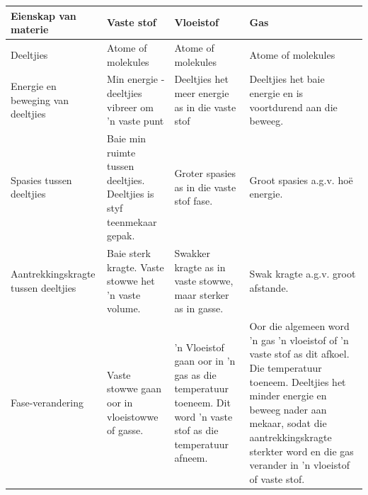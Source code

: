 \begin{table}[h]
\begin{center}

\begin{tabular}{|p{3cm}|p{3cm}|p{3cm}|p{3cm}|}\hline
\textbf{Eienskap van materie} & \textbf{Vaste stof} & \textbf{Vloeistof} & \textbf{Gas} \\\hline
Deeltjies & Atome of molekules & Atome of molekules & Atome of molekules \\\hline
Energie en beweging van deeltjies & Min energie - deeltjies vibreer om 'n vaste punt & Deeltjies het meer energie as in die vaste stof & Deeltjies het baie energie en is voortdurend aan die beweeg.  \\\hline
Spasies tussen  deeltjies & Baie min ruimte tussen deeltjies. Deeltjies is styf teenmekaar gepak. & Groter spasies as in die vaste stof fase. & Groot spasies a.g.v. ho\"{e} energie.  \\\hline
Aantrekkingskragte tussen deeltjies & Baie sterk kragte. Vaste stowwe het  'n vaste volume. & Swakker kragte as in vaste stowwe, maar sterker as in gasse. & Swak kragte a.g.v. groot afstande. \\\hline
Fase-verandering & Vaste stowwe gaan oor in vloeistowwe of gasse. & 'n Vloeistof gaan oor in 'n gas as die temperatuur toeneem. Dit word 'n vaste stof as die temperatuur afneem. & Oor die algemeen word 'n gas 'n vloeistof of 'n vaste stof as dit afkoel. Die temperatuur toeneem. Deeltjies het minder energie en beweeg nader aan mekaar, sodat die aantrekkingskragte sterkter word en die gas verander in  'n vloeistof of vaste stof.  \\\hline
\end{tabular}
\label{tab:microscopic:kinetic theory}
\end{center}
\end{table}
    \par
